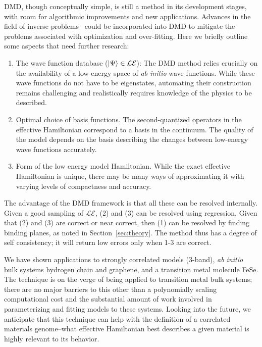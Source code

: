DMD, though conceptually simple, is still a method in its development stages, with room for algorithmic improvements and new applications. 
Advances in the field of inverse problems~\cite{Berg2017} could be incorporated into DMD to 
mitigate the problems associated with optimization and over-fitting. 
Here we briefly outline some aspects that need further research:
\begin{enumerate}
	\item The wave function database ($\ket{\Psi} \in \mathcal{LE}$):
	The DMD method relies crucially on the availability of a low energy space of \textit{ab initio} wave functions. While these wave functions do not have to be eigenstates, automating their construction remains challenging and realistically requires knowledge of the physics to be described.
	\item Optimal choice of basis functions. The second-quantized operators in the effective Hamiltonian correspond to a basis in the continuum. The quality of the model depends on the basis describing the changes between low-energy wave functions accurately.
	\item Form of the low energy model Hamiltonian. While the exact effective Hamiltonian is unique, there may be many ways of approximating it with varying levels of compactness and accuracy.
\end{enumerate} 
The advantage of the DMD framework is that all these can be resolved internally.
Given a good sampling of $\mathcal{LE}$, (2) and (3) can be resolved using regression. 
Given that (2) and (3) are correct or near correct, then (1) can be resolved by finding binding planes, as noted in Section~\ref{sec:theory}.
The method thus has a degree of self consistency; it will return low errors only when 1-3 are correct.

We have shown applications to strongly correlated models (3-band), {\it ab initio} bulk systems hydrogen chain and graphene, and a transition metal molecule FeSe.
The technique is on the verge of being applied to transition metal bulk systems; there are no major barriers to this other than a polynomially scaling computational cost and the substantial amount of work involved in parameterizing and fitting models to these systems.
Looking into the future, we anticipate that this technique can help with the definition of a correlated materials genome--what effective Hamiltonian best describes a given material is highly relevant to its behavior.


